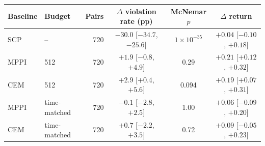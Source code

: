 \begin{tabular}{llrccc}
\toprule
Baseline & Budget & Pairs & $\Delta$ violation rate (pp) & McNemar $p$ & $\Delta$ return \\
\midrule
SCP & -- & 720 & $-30.0$ [$-34.7$, $-25.6$] & $1\times 10^{-35}$ & $+0.04$ [$-0.10$, $+0.18$] \\
MPPI & 512 & 720 & $+1.9$ [$-0.8$, $+4.9$] & 0.29 & $+0.21$ [$+0.12$, $+0.32$] \\
CEM & 512 & 720 & $+2.9$ [$+0.4$, $+5.6$] & 0.094 & $+0.19$ [$+0.07$, $+0.31$] \\
MPPI & time-matched & 720 & $-0.1$ [$-2.8$, $+2.5$] & 1.00 & $+0.06$ [$-0.09$, $+0.20$] \\
CEM & time-matched & 720 & $+0.7$ [$-2.2$, $+3.5$] & 0.72 & $+0.09$ [$-0.05$, $+0.23$] \\
\bottomrule
\end{tabular}
